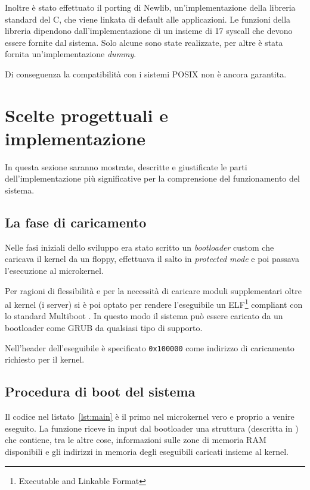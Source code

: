 \documentclass[12pt,a4paper]{report}
\begin{document}
			Inoltre è stato effettuato il porting di Newlib, un'implementazione della libreria standard del C,
			che viene linkata di default alle applicazioni. Le funzioni della libreria dipendono dall'implementazione
			di un insieme di 17 syscall che devono essere fornite dal sistema. Solo alcune sono state realizzate,
			per altre è stata fornita un'implementazione \emph{dummy}.
			
			Di conseguenza la compatibilità con i sistemi POSIX non è ancora garantita.
	
	\section{Scelte progettuali e implementazione} 
		In questa sezione saranno mostrate, descritte e giustificate le parti dell'implementazione
		più significative per la comprensione del funzionamento del sistema.
	
		\subsection{La fase di caricamento}
			Nelle fasi iniziali dello sviluppo era stato scritto un \emph{bootloader} custom che caricava il kernel
			da un floppy, effettuava il salto in \emph{protected mode} e poi passava l'esecuzione al microkernel.
			
			Per ragioni di flessibilità e per la necessità di caricare moduli supplementari oltre al kernel (i server)
			si è poi optato per rendere l'eseguibile un ELF\footnote{Executable and Linkable Format} compliant con lo standard Multiboot \cite{Multiboot}.
			In questo modo il sistema può essere caricato da un bootloader come GRUB da qualsiasi tipo di supporto.
			
			Nell'header dell'eseguibile è specificato \texttt{0x100000} come indirizzo di caricamento richiesto per il kernel.
			
		\subsection{Procedura di boot del sistema}			
			Il codice nel listato~\ref{lst:main} è il primo nel microkernel vero e proprio a venire eseguito.
			La funzione riceve in input dal bootloader una struttura (descritta in \cite{Multiboot}) che contiene,
			tra le altre cose, informazioni sulle zone di memoria RAM disponibili e gli indirizzi in memoria
			degli eseguibili caricati insieme al kernel.
			
			
			
\end{document}
